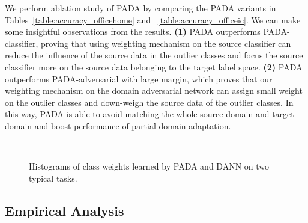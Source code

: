 \documentclass[runningheads]{llncs}
\begin{document}
We perform ablation study of PADA by comparing the PADA variants in Tables~\ref{table:accuracy_officehome} and ~\ref{table:accuracy_officeic}. We can make some insightful observations from the results. \textbf{(1)} PADA outperforms PADA-classifier, proving that using weighting mechanism on the source classifier can reduce the influence of the source data in the outlier classes and focus the source classifier more on the source data belonging to the target label space. \textbf{(2)} PADA outperforms PADA-adversarial with large margin, which proves that our weighting mechanism on the domain adversarial network can assign small weight on the outlier classes and down-weigh the source data of the outlier classes. In this way, PADA is able to avoid matching the whole source domain and target domain and boost performance of partial domain adaptation. 

\begin{figure}[!bp]
  \centering
  \hfil
  \\
  \hfil
  \caption{Histograms of class weights learned by PADA and DANN on two typical tasks.}
\end{figure}

\subsection{Empirical Analysis}
\end{document}
